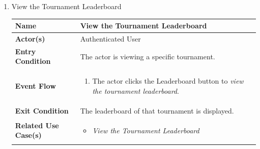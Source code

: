 \begin{enumerate}
\newpage

\item View the Tournament Leaderboard
\begin{center}
    \begin{tabular}{ | m{10em} | m{10cm}| } 
      \hline
      \textbf{Name} & View the Tournament Leaderboard \\ 
      \hline
      \textbf{Actor(s)} & Authenticated User \\ 
      \hline
      \textbf{Entry Condition} & The actor is viewing a specific tournament. \\ 
      \hline
      \textbf{Event Flow} & 
          \begin{enumerate}[(1)]
              \item The actor clicks the Leaderboard button to \textit{view the tournament leaderboard}.
          \end{enumerate}
      \\ 
      \hline
      \textbf{Exit Condition} & The leaderboard of that tournament is displayed.  \\ 
      \hline
      \textbf{Related Use Case(s)} & 
      \begin{itemize}
      \item \textit{View the Tournament Leaderboard}
      \end{itemize}
          \\ 
      \hline
    \end{tabular}
\end{center}



\end{enumerate}
